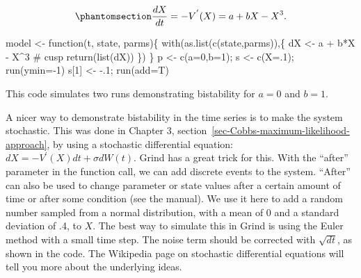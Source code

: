 \documentclass[
  a4paper,
  DIV=11,
  numbers=noendperiod,
  oneside]{scrreprt}
\newenvironment{Shaded}{}{}
\newcommand{\AttributeTok}[1]{\textcolor[rgb]{0.84,0.23,0.29}{#1}}
\newcommand{\CommentTok}[1]{\textcolor[rgb]{0.42,0.45,0.49}{#1}}
\newcommand{\ControlFlowTok}[1]{\textcolor[rgb]{0.84,0.23,0.29}{#1}}
\newcommand{\DecValTok}[1]{\textcolor[rgb]{0.00,0.36,0.77}{#1}}
\newcommand{\FunctionTok}[1]{\textcolor[rgb]{0.44,0.26,0.76}{#1}}
\newcommand{\NormalTok}[1]{\textcolor[rgb]{0.14,0.16,0.18}{#1}}
\newcommand{\OtherTok}[1]{\textcolor[rgb]{0.44,0.26,0.76}{#1}}
\newcommand{\SpecialCharTok}[1]{\textcolor[rgb]{0.00,0.36,0.77}{#1}}
\begin{document}
\begin{equation}\phantomsection\label{eq-ch4n-5-old-25}{
\frac{dX}{dt} = - V^{'}(X) = {a + bX - X}^{3}.
}\end{equation}

\begin{Shaded}
\begin{Highlighting}[]
\NormalTok{model }\OtherTok{\textless{}{-}} \ControlFlowTok{function}\NormalTok{(t, state, parms)\{}
  \FunctionTok{with}\NormalTok{(}\FunctionTok{as.list}\NormalTok{(}\FunctionTok{c}\NormalTok{(state,parms)),\{}
\NormalTok{    dX }\OtherTok{\textless{}{-}}\NormalTok{  a }\SpecialCharTok{+}\NormalTok{ b}\SpecialCharTok{*}\NormalTok{X }\SpecialCharTok{{-}}\NormalTok{ X}\SpecialCharTok{\^{}}\DecValTok{3}        \CommentTok{\# cusp}
    \FunctionTok{return}\NormalTok{(}\FunctionTok{list}\NormalTok{(dX))}
\NormalTok{  \})}
\NormalTok{\}}
\NormalTok{p }\OtherTok{\textless{}{-}} \FunctionTok{c}\NormalTok{(}\AttributeTok{a=}\DecValTok{0}\NormalTok{,}\AttributeTok{b=}\DecValTok{1}\NormalTok{); s }\OtherTok{\textless{}{-}} \FunctionTok{c}\NormalTok{(}\AttributeTok{X=}\NormalTok{.}\DecValTok{1}\NormalTok{); }\FunctionTok{run}\NormalTok{(}\AttributeTok{ymin=}\SpecialCharTok{{-}}\DecValTok{1}\NormalTok{)}
\NormalTok{s[}\DecValTok{1}\NormalTok{] }\OtherTok{\textless{}{-}} \SpecialCharTok{{-}}\NormalTok{.}\DecValTok{1}\NormalTok{; }\FunctionTok{run}\NormalTok{(}\AttributeTok{add=}\NormalTok{T)}
\end{Highlighting}
\end{Shaded}

This code simulates two runs demonstrating bistability for \(a = 0\) and
\(b = 1\).

A nicer way to demonstrate bistability in the time series is to make the
system stochastic. This was done in Chapter 3,
section~\ref{sec-Cobbs-maximum-likelihood-approach}, by using a
stochastic differential equation: \(dX = - V^{'}(X)dt + \sigma dW(t)\).
Grind has a great trick for this. With the ``after'' parameter in the
function call, we can add discrete events to the system. ``After'' can
also be used to change parameter or state values after a certain amount
of time or after some condition (see the manual). We use it here to add
a random number sampled from a normal distribution, with a mean of 0 and
a standard deviation of .4, to \(X\). The best way to simulate this in
Grind is using the Euler method with a small time step. The noise term
should be corrected with \(\sqrt{dt}\), as shown in the code. The
Wikipedia page on stochastic differential equations will tell you more
about the underlying ideas.
\end{document}
